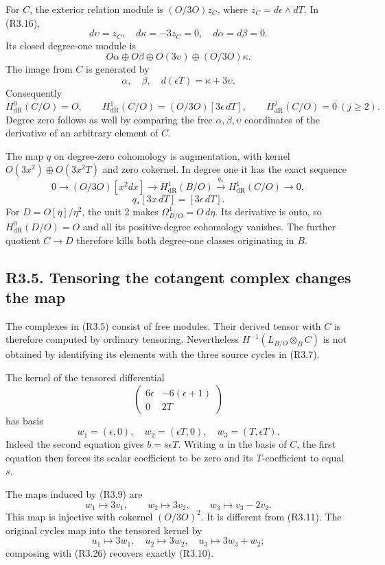 \documentclass[
  10pt,
]{article}
\begin{document}
For \(C\), the exterior relation module is \((O/3O)z_C\), where
\(z_C=d\epsilon\wedge dT\). In (R3.16), \[
d\upsilon=z_C,\quad d\kappa=-3z_C=0,\quad
d\alpha=d\beta=0.
\] Its closed degree-one module is \[
O\alpha\oplus O\beta\oplus O(3\upsilon)\oplus(O/3O)\kappa.
\] The image from \(C\) is generated by \[
\alpha,\quad\beta,\quad d(\epsilon T)=\kappa+3\upsilon.
\] Consequently \[
H^0_{\mathrm{dR}}(C/O)=O,\qquad
H^1_{\mathrm{dR}}(C/O)=(O/3O)[3\epsilon\,dT],\qquad
H^j_{\mathrm{dR}}(C/O)=0\ (j\ge2).
\tag{R3.23}
\] Degree zero follows as well by comparing the free
\(\alpha,\beta,\upsilon\) coordinates of the derivative of an arbitrary
element of \(C\).

The map \(q\) on degree-zero cohomology is augmentation, with kernel
\(O(3x^2)\oplus O(3x^2T)\) and zero cokernel. In degree one it has the
exact sequence \[
0\longrightarrow(O/3O)[x^2dx]\longrightarrow
H^1_{\mathrm{dR}}(B/O)\xrightarrow{q_*}
H^1_{\mathrm{dR}}(C/O)\longrightarrow0,
\] \[
q_*[3x\,dT]=[3\epsilon\,dT].
\tag{R3.24}
\] For \(D=O[\eta]/\eta^2\), the unit 2 makes
\(\Omega^1_{D/O}=O\,d\eta\). Its derivative is onto, so
\(H^0_{\mathrm{dR}}(D/O)=O\) and all its positive-degree cohomology
vanishes. The further quotient \(C\to D\) therefore kills both
degree-one classes originating in \(B\).

\subsection{R3.5. Tensoring the cotangent complex changes the
map}\label{r3.5.-tensoring-the-cotangent-complex-changes-the-map}

The complexes in (R3.5) consist of free modules. Their derived tensor
with \(C\) is therefore computed by ordinary tensoring. Nevertheless
\(H^{-1}(L_{B/O}\otimes_B C)\) is not obtained by identifying its
elements with the three source cycles in (R3.7).

The kernel of the tensored differential \[
\begin{pmatrix}6\epsilon&-6(\epsilon+1)\\0&2T\end{pmatrix}
\] has basis \[
w_1=(\epsilon,0),\quad w_2=(\epsilon T,0),\quad
w_3=(T,\epsilon T).
\tag{R3.25}
\] Indeed the second equation gives \(b=s\epsilon T\). Writing \(a\) in
the basis of \(C\), the first equation then forces its scalar
coefficient to be zero and its \(T\)-coefficient to equal \(s\).

The maps induced by (R3.9) are \[
w_1\longmapsto3v_1,\qquad
w_2\longmapsto3v_2,\qquad
w_3\longmapsto v_3-2v_2.
\tag{R3.26}
\] This map is injective with cokernel \((O/3O)^2\). It is different
from (R3.11). The original cycles map into the tensored kernel by \[
u_1\longmapsto3w_1,\quad
u_2\longmapsto3w_2,\quad
u_3\longmapsto3w_3+w_2;
\] composing with (R3.26) recovers exactly (R3.10).
\end{document}
